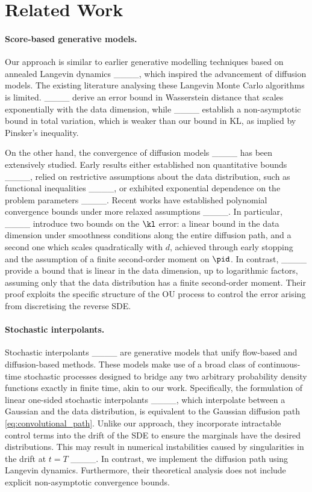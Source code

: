 \section{Related Work}
\label{sec:related_work}


\paragraph{Score-based generative models.
}
Our approach is similar to earlier generative modelling techniques based on annealed Langevin dynamics ____, which inspired the advancement of diffusion models.
The existing literature analysing these Langevin Monte Carlo algorithms is limited.
____ derive an error bound in Wasserstein distance that scales exponentially with the data dimension, while ____ establish a non-asymptotic bound in total variation, which is weaker than our bound in \gls*{KL}, as implied by Pinsker's inequality.

On the other hand, the convergence of diffusion models ____ has been extensively studied. 
Early results either established non quantitative bounds ____, relied on restrictive assumptions about the data distribution, such as functional inequalities ____, or exhibited exponential dependence on the problem parameters ____. 
Recent works have established polynomial convergence bounds under more relaxed assumptions ____. In particular, ____ introduce two bounds on the $\kl$ error: a linear bound in the data dimension under smoothness conditions along the entire diffusion path, and a second one which scales quadratically with $d$, achieved through early stopping and the assumption of a finite second-order moment on $\pid$. In contrast, ____ provide a bound that is linear in the data dimension, up to logarithmic factors, assuming only that the data distribution has a finite second-order moment. Their proof exploits the specific structure of the \gls*{OU} process to control the error arising from discretising the reverse \gls*{SDE}.


\paragraph{Stochastic interpolants.}

Stochastic interpolants ____ are generative models that unify flow-based and diffusion-based methods. These models make use of a broad class of continuous-time stochastic processes designed to bridge any two arbitrary probability density functions exactly in finite time, akin to our work. 
Specifically, the formulation of linear one-sided stochastic interpolants ____, which interpolate between a Gaussian and the data distribution, is equivalent to the Gaussian diffusion path \eqref{eq:convolutional_path}. 
Unlike our approach, they incorporate intractable control terms into the drift of the \gls*{SDE} to ensure the marginals have the desired distributions. This may result in  numerical instabilities caused by singularities in the drift at $t= T$ ____. In contrast, we implement the diffusion path using Langevin dynamics. Furthermore, their theoretical analysis does not include explicit non-asymptotic convergence bounds.

